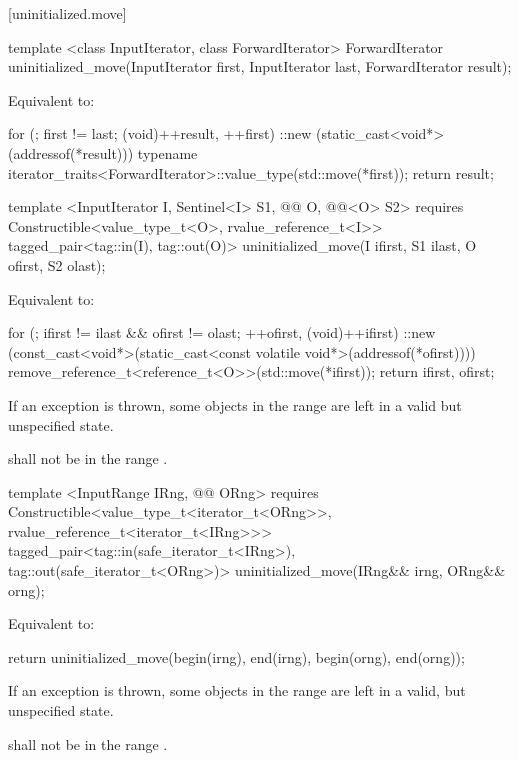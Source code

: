 [uninitialized.move]{}
{\color{remclr}
\begin{codeblock}
template <class InputIterator, class ForwardIterator>
  ForwardIterator uninitialized_move(InputIterator first, InputIterator last,
                                     ForwardIterator result);
\end{codeblock}

\setcounter{Paras}{0}
\pnum
\effects Equivalent to:
\begin{codeblock}
    for (; first != last; (void)++result, ++first)
      ::new (static_cast<void*>(addressof(*result)))
        typename iterator_traits<ForwardIterator>::value_type(std::move(*first));
    return result;
\end{codeblock}
} %
{\color{addclr}
\begin{codeblock}
template <InputIterator I, Sentinel<I> S1, @@ O, @@<O> S2>
  requires
Constructible<value_type_t<O>, rvalue_reference_t<I>>
  tagged_pair<tag::in(I), tag::out(O)>
uninitialized_move(I ifirst, S1 ilast, O ofirst, S2 olast);
\end{codeblock}

\setcounter{Paras}{0}
\pnum
\effects Equivalent to:
\begin{codeblock}
    for (; ifirst != ilast && ofirst != olast; ++ofirst, (void)++ifirst) {
      ::new (const_cast<void*>(static_cast<const volatile void*>(addressof(*ofirst))))
        remove_reference_t<reference_t<O>>(std::move(*ifirst));
    }
    return {ifirst, ofirst};
\end{codeblock}
} %

\pnum
\remarks If an exception is thrown, some objects in the range  are left in a valid but
unspecified state.

{\color{addclr}
\pnum
\requires {} shall not be in the range .

\begin{codeblock}
template <InputRange IRng, @@ ORng>
  requires
Constructible<value_type_t<iterator_t<ORng>>, rvalue_reference_t<iterator_t<IRng>>>
  tagged_pair<tag::in(safe_iterator_t<IRng>), tag::out(safe_iterator_t<ORng>)>
uninitialized_move(IRng&& irng, ORng&& orng);
\end{codeblock}

\pnum
\effects Equivalent to:
\begin{codeblock}
    return uninitialized_move(begin(irng), end(irng), begin(orng), end(orng));
\end{codeblock}

\pnum
\remarks If an exception is thrown, some objects in the range  are left in a valid, but
unspecified state.

\pnum
\requires {} shall not be in the range .
} %

